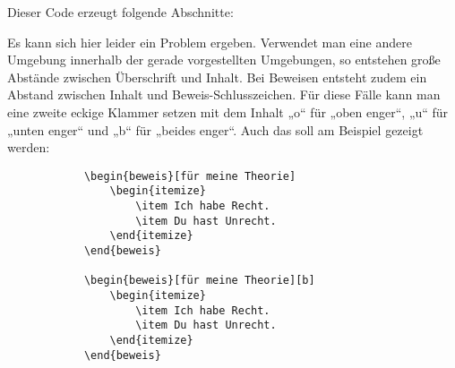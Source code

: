 			Dieser Code erzeugt folgende Abschnitte: 
			
			\newline
				
			Es kann sich hier leider ein Problem ergeben. Verwendet man eine andere Umgebung innerhalb der gerade vorgestellten Umgebungen, so entstehen große Abstände zwischen Überschrift und Inhalt. Bei Beweisen entsteht zudem ein Abstand zwischen Inhalt und Beweis-Schlusszeichen. Für diese Fälle kann man eine zweite eckige Klammer setzen mit dem Inhalt „o“ für „oben enger“, „u“ für „unten enger“ und „b“ für „beides enger“. Auch das soll am Beispiel gezeigt werden: 
			
			\begin{verbatim}
			\begin{beweis}[für meine Theorie]
				\begin{itemize}
					\item Ich habe Recht.
					\item Du hast Unrecht.
				\end{itemize}
			\end{beweis}
			
			\begin{beweis}[für meine Theorie][b]
				\begin{itemize}
					\item Ich habe Recht.
					\item Du hast Unrecht.
				\end{itemize}
			\end{beweis}
			\end{verbatim}\newline
			

